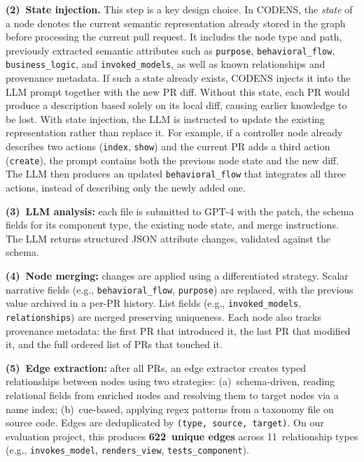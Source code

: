 \documentclass[sigconf]{acmart}
\begin{document}
\textbf{(2)~State injection.} This step is a key design choice. 
In CODENS, the \emph{state} of a node denotes the current semantic representation already stored in the graph before processing the current pull request. 
It includes the node type and path, previously extracted semantic attributes such as \texttt{purpose}, \texttt{behavioral\_flow}, \texttt{business\_logic}, and \texttt{invoked\_models}, as well as known relationships and provenance metadata. 
If such a state already exists, CODENS injects it into the LLM prompt together with the new PR diff. 
Without this state, each PR would produce a description based solely on its local diff, causing earlier knowledge to be lost. With state injection, the LLM is instructed to update the existing representation rather than replace it. For example, if a controller node already describes two actions (\texttt{index}, \texttt{show}) and the current PR adds a third action (\texttt{create}), the prompt contains both the previous node state and the new diff. 
The LLM then produces an updated \texttt{behavioral\_flow} that integrates all three actions, instead of describing only the newly added one.

\textbf{(3)~LLM analysis:} each file is submitted to GPT-4 with the patch, the schema fields for its component type, the existing node state, and merge instructions. The LLM returns structured JSON attribute changes, validated against the schema.

\textbf{(4)~Node merging:} changes are applied using a differentiated strategy. Scalar narrative fields (e.g., \texttt{behavioral\_flow}, \texttt{purpose}) are replaced, with the previous value archived in a per-PR history. List fields (e.g., \texttt{invoked\_models}, \texttt{relationships}) are merged preserving uniqueness. Each node also tracks provenance metadata: the first PR that introduced it, the last PR that modified it, and the full ordered list of PRs that touched it.

\textbf{(5)~Edge extraction:} after all PRs, an edge extractor creates typed relationships between nodes using two strategies: (a)~schema-driven, reading relational fields from enriched nodes and resolving them to target nodes via a name index; (b)~cue-based, applying regex patterns from a taxonomy file on source code. Edges are deduplicated by \texttt{(type, source, target)}. On our evaluation project, this produces \textbf{622~unique edges} across 11~relationship types (e.g., \texttt{invokes\_model}, \texttt{renders\_view}, \texttt{tests\_component}).
\end{document}
